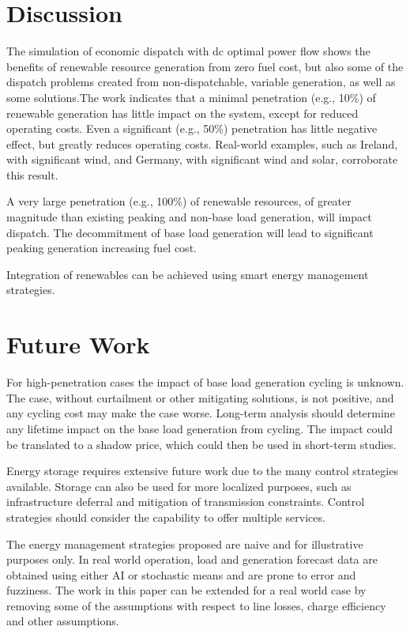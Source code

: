 \documentclass[a4paper]{article}
\begin{document}
\section{Discussion}

The simulation of economic dispatch with dc optimal power flow shows the benefits of renewable resource generation from zero fuel cost, but also some of the dispatch problems created from non-dispatchable, variable generation, as well as some solutions.The work indicates that a minimal penetration (e.g., 10\%) of renewable generation has little impact on the system, except for reduced operating costs. Even a significant (e.g., 50\%) penetration has little negative effect, but greatly reduces operating costs. Real-world examples, such as Ireland, with significant wind, and Germany, with significant wind and solar, corroborate this result.

A very large penetration (e.g., 100\%) of renewable resources, of greater magnitude than existing peaking and non-base load generation, will impact dispatch. The decommitment of base load generation will lead to significant peaking generation increasing fuel cost.

Integration of renewables can be achieved using smart energy management strategies.   



\section{Future Work}

For high-penetration cases the impact of base load generation cycling is unknown. The case, without curtailment or other mitigating solutions, is not positive, and any cycling cost may make the case worse. Long-term analysis should determine any lifetime impact on the base load generation from cycling. The impact could be translated to a shadow price, which could then be used in short-term studies.

Energy storage requires extensive future work due to the many control strategies available. Storage can also be used for more localized purposes, such as infrastructure deferral and mitigation of transmission constraints. Control strategies should consider the capability to offer multiple services.

The energy management strategies proposed are naive and for illustrative purposes only. In real world operation, load and generation forecast data are obtained using either AI or stochastic means and are prone to error and fuzziness. The work in this paper can be extended for a real world case by removing some of the assumptions with respect to line losses, charge efficiency and other assumptions.
\end{document}
